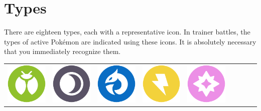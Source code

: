 \chapter{Types\label{chap:types}}
\nopagecolor{}There are eighteen types, each with a representative icon.
In trainer battles, the types of active Pokémon are indicated
 using these icons.
It is absolutely necessary that you immediately recognize them.

\begin{table}[ht!]
  \begin{center}
  \begin{tabular}{c c c c c c c c c}
  \includegraphics[scale=.25]{images/bug.png} &
  \includegraphics[scale=.25]{images/dark.png} &
  \includegraphics[scale=.25]{images/dragon.png} &
  \includegraphics[scale=.25]{images/electric.png} &
  \includegraphics[scale=.25]{images/fairy.png} &

\end{tabular}
\end{center}
\end{table}
